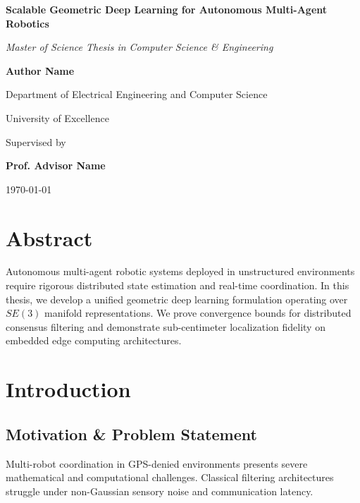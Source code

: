 \documentclass[11pt,a4paper,oneside]{report}
\begin{document}
\begin{titlepage}
    \centering
    \vspace*{1.5cm}
    {\Huge\bfseries\color{thesisblue} Scalable Geometric Deep Learning for Autonomous Multi-Agent Robotics \par}
    \vspace{1.5cm}
    {\Large\itshape Master of Science Thesis in Computer Science \& Engineering \par}
    \vspace{2cm}
    {\large\textbf{Author Name} \par}
    \vspace{0.5cm}
    {\normalsize Department of Electrical Engineering and Computer Science \par}
    {\normalsize University of Excellence \par}
    \vfill
    {\large Supervised by \par}
    {\large\textbf{Prof. Advisor Name} \par}
    \vfill
    {\large\today \par}
\end{titlepage}

\chapter*{Abstract}
Autonomous multi-agent robotic systems deployed in unstructured environments require rigorous distributed state estimation and real-time coordination. In this thesis, we develop a unified geometric deep learning formulation operating over $SE(3)$ manifold representations. We prove convergence bounds for distributed consensus filtering and demonstrate sub-centimeter localization fidelity on embedded edge computing architectures.

\tableofcontents
\listoffigures
\listoftables

\clearpage
{}

\chapter{Introduction}
\section{Motivation \& Problem Statement}
Multi-robot coordination in GPS-denied environments presents severe mathematical and computational challenges. Classical filtering architectures struggle under non-Gaussian sensory noise and communication latency.
\end{document}
